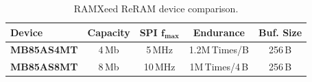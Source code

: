 \begin{table}[t!]
	\centering
	\caption{RAMXeed ReRAM device comparison.}
	\label{tab:reram_spec}
	\renewcommand{\arraystretch}{1.0}
	\setlength{\tabcolsep}{3.5pt}
	\begin{minipage}{0.98\columnwidth}
		\centering
		\begin{tabular}{lcccc}
			\toprule
			\textbf{Device}    & \textbf{Capacity}  & \textbf{SPI} $\mathbf{f_{\max}}$ &
			\textbf{Endurance} & \textbf{Buf. Size}                                                              \\
			\midrule
			\textbf{MB85AS4MT} & 4\,Mb              & 5\,MHz                           & 1.2M\,Times/B  & 256\,B \\
			\textbf{MB85AS8MT} & 8\,Mb              & 10\,MHz                          & 1M\,Times/4\,B & 256\,B \\
			\bottomrule
		\end{tabular}
	\end{minipage}
\end{table}
